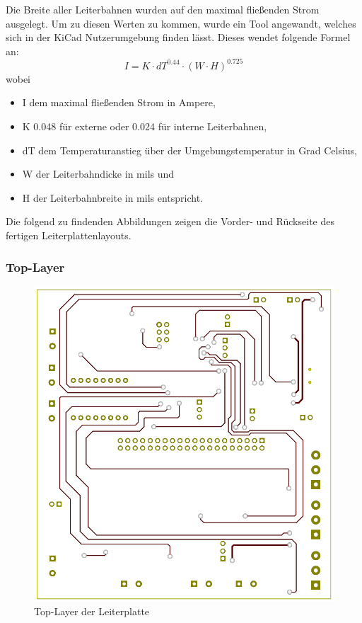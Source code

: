 Die Breite aller Leiterbahnen wurden auf den maximal fließenden Strom ausgelegt.
Um zu diesen Werten zu kommen, wurde ein Tool angewandt, welches sich in der KiCad Nutzerumgebung finden lässt.
Dieses wendet folgende Formel an: \\

\begin{equation}
    I = K \cdot dT^{0.44} \cdot (W \cdot H)^{0.725}
\end{equation}
wobei
\begin{itemize}
    \item I dem maximal fließenden Strom in Ampere,
    \item K 0.048 für externe oder 0.024 für interne Leiterbahnen,
    \item dT dem Temperaturanstieg über der Umgebungstemperatur in Grad Celsius,
    \item W der Leiterbahndicke in mils und
    \item H der Leiterbahnbreite in mils entspricht.
\end{itemize}

Die folgend zu findenden Abbildungen zeigen die Vorder- und Rückseite des fertigen Leiterplattenlayouts.

\newpage
\subsubsection{Top-Layer}

\begin{figure}[hbt]
    \centering
    \includegraphics[scale=0.26]{fig/elektro/TopLayer.png}
    \caption{Top-Layer der Leiterplatte}
\end{figure}

